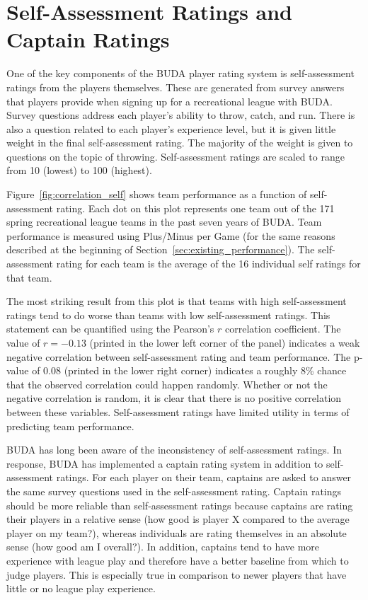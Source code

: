 \section{Self-Assessment Ratings and Captain Ratings}\label{sec:self_rating}

One of the key components of the BUDA player rating system is self-assessment ratings from the players themselves.  These are generated from survey answers that players provide when signing up for a recreational league with BUDA. Survey questions address each player's ability to throw, catch, and run.  There is also a question related to each player's experience level, but it is given little weight in the final self-assessment rating. The majority of the weight is given to questions on the topic of throwing. Self-assessment ratings are scaled to range from 10 (lowest) to 100 (highest).

Figure~\ref{fig:correlation_self} shows team performance as a function of self-assessment rating. Each dot on this plot represents one team out of the 171 spring recreational league teams in the past seven years of BUDA.  Team performance is measured using Plus/Minus per Game (for the same reasons described at the beginning of Section~\ref{sec:existing_performance}). The self-assessment rating for each team is the average of the 16 individual self ratings for that team.

The most striking result from this plot is that teams with high self-assessment ratings tend to do worse than teams with low self-assessment ratings. This statement can be quantified using the Pearson's $r$ correlation coefficient. The value of $r = -0.13$ (printed in the lower left corner of the panel) indicates a weak negative correlation between self-assessment rating and team performance.   The p-value of 0.08 (printed in the lower right corner) indicates a roughly 8\% chance that the observed correlation could happen randomly. Whether or not the negative correlation is random, it is clear that there is no positive correlation between these variables.  Self-assessment ratings have limited utility in terms of predicting team performance.

BUDA has long been aware of the inconsistency of self-assessment ratings.  In response, BUDA has implemented a captain rating system in addition to self-assessment ratings.  For each player on their team, captains are asked to answer the same survey questions used in the self-assessment rating.  Captain ratings should be more reliable than self-assessment ratings because captains are rating their players in a relative sense (how good is player X compared to the average player on my team?), whereas individuals are rating themselves in an absolute sense (how good am I overall?). In addition, captains tend to have more experience with league play and therefore have a better baseline from which to judge players. This is especially true in comparison to newer players that have little or no league play experience.

